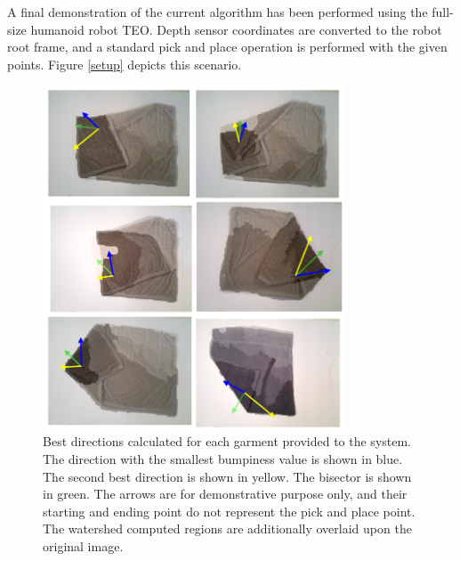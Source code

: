 
A final demonstration of the current algorithm has been performed using the full-size humanoid robot TEO. Depth sensor coordinates are converted to the robot root frame, and a standard pick and place operation is performed with the given points. Figure \ref{setup} depicts this scenario.

\begin{figure}[thpb]
    \centering
    \includegraphics[width=0.8\textwidth]{figures/directions_several.png}
    \caption{Best directions calculated for each garment provided to the system. The direction with the smallest bumpiness value is shown in blue. The second best direction is shown in yellow. The bisector is shown in green. The arrows are for demonstrative purpose only, and their starting and ending point do not represent the pick and place point. The watershed computed regions are additionally overlaid upon the original image.}
    \label{directions_several}
\end{figure}
